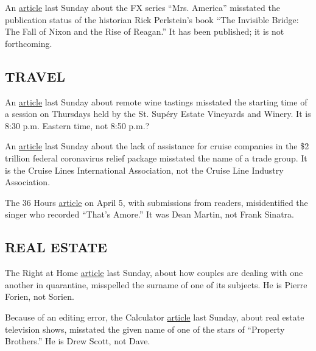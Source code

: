 An
\href{https://www.nytimes3xbfgragh.onion/2020/04/10/arts/television/mrs-america-cate-blanchett.html}{article}
last Sunday about the FX series ``Mrs. America'' misstated the
publication status of the historian Rick Perlstein's book ``The
Invisible Bridge: The Fall of Nixon and the Rise of Reagan.'' It has
been published; it is not forthcoming.

\hypertarget{travel}{%
\subsection{TRAVEL}\label{travel}}

An
\href{https://www.nytimes3xbfgragh.onion/2020/04/08/travel/coronavirus-wine-tastings.html}{article}
last Sunday about remote wine tastings misstated the starting time of a
session on Thursdays held by the St. Supéry Estate Vineyards and Winery.
It is 8:30 p.m. Eastern time, not 8:50 p.m.?

An
\href{https://www.nytimes3xbfgragh.onion/2020/04/08/travel/cruises-coronavirus-stimulus.html}{article}
last Sunday about the lack of assistance for cruise companies in the \$2
trillion federal coronavirus relief package misstated the name of a
trade group. It is the Cruise Lines International Association, not the
Cruise Line Industry Association.

The 36 Hours
\href{https://www.nytimes3xbfgragh.onion/2020/04/02/travel/36-hours-quarantine.html}{article}
on April 5, with submissions from readers, misidentified the singer who
recorded ``That's Amore.'' It was Dean Martin, not Frank Sinatra.

\hypertarget{real-estate}{%
\subsection{REAL ESTATE}\label{real-estate}}

The Right at Home
\href{https://www.nytimes3xbfgragh.onion/2020/04/10/realestate/couples-quality-time-all-the-time.html}{article}
last Sunday, about how couples are dealing with one another in
quarantine, misspelled the surname of one of its subjects. He is Pierre
Forien, not Sorien.

Because of an editing error, the Calculator
\href{https://www.nytimes3xbfgragh.onion/2020/04/09/realestate/how-long-does-it-take-to-binge-watch-every-real-estate-tv-show.html}{article}
last Sunday, about real estate television shows, misstated the given
name of one of the stars of ``Property Brothers.'' He is Drew Scott, not
Dave.

